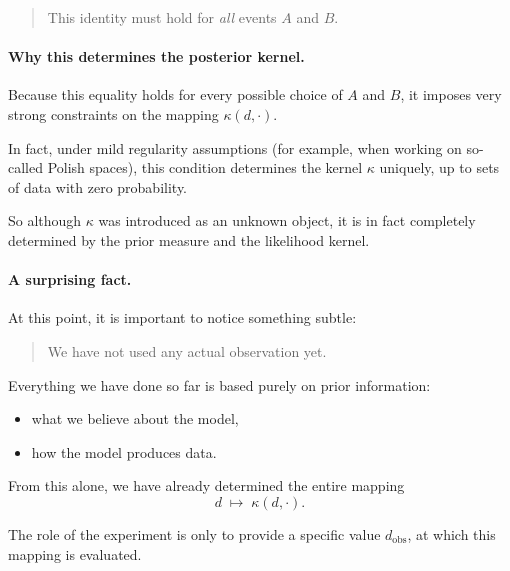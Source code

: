 \documentclass[11pt]{article}
\theoremstyle{remark}
\begin{document}
\begin{quote}
This identity must hold for \emph{all} events \(A\) and \(B\).
\end{quote}

\vspace{2mm}

\paragraph{Why this determines the posterior kernel.}

Because this equality holds for every possible choice of \(A\) and \(B\), it imposes very strong constraints on the mapping \(\kappa(d,\cdot)\).

In fact, under mild regularity assumptions (for example, when working on so-called Polish spaces), this condition determines the kernel \(\kappa\) uniquely, up to sets of data with zero probability.

\vspace{2mm}

So although \(\kappa\) was introduced as an unknown object, it is in fact completely determined by the prior measure and the likelihood kernel.

\vspace{2mm}

\paragraph{A surprising fact.}

At this point, it is important to notice something subtle:

\begin{quote}
We have not used any actual observation yet.
\end{quote}

Everything we have done so far is based purely on prior information:
\begin{itemize}
    \item what we believe about the model,
    \item how the model produces data.
\end{itemize}

From this alone, we have already determined the entire mapping
\[
d \;\longmapsto\; \kappa(d,\cdot).
\]

\vspace{2mm}

The role of the experiment is only to provide a specific value \(d_{\mathrm{obs}}\), at which this mapping is evaluated.
\end{document}
